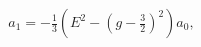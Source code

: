 \begin{equation}
 a_1 = - \tfrac{1}{3} \left(E^2 -\left(g-\tfrac{3}{2}\right)^2 \right) a_0,
\end{equation}

